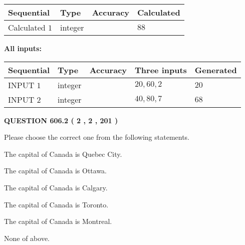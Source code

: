 \documentclass[12pt]{article}
\begin{document}
   
\noindent{}
   
   
  
  
\noindent\begin{tabular}{|l|l|l|l|}
\hline
 Sequential & Type & Accuracy & Calculated \\ 
\hline
 
 
  Calculated $  1 $ & integer &  & 
  $ 88 $ 
 \\  \hline  
 \end{tabular}
   
   
   
   
\noindent\vspace{0.1in}\hspace{-0.08in} {\textbf{\Large{All inputs: }}}
   
   
  
  
\noindent\begin{tabular}{|l|l|l|l|l|}
\hline
 Sequential & Type & Accuracy & Three inputs & Generated \\ 
\hline
 
 
  INPUT $  1 $ & integer &  & $
 20
 , 
 60
 , 
 2
 $ & $ 20 $ 
 \\  \hline  
 
 
  INPUT $  2 $ & integer &  & $
 40
 , 
 80
 , 
 7
 $ & $ 68 $ 
 \\  \hline  
 \end{tabular}
   
   
  
\vspace{0.2in}
  
{\textbf{\Large{QUESTION
606.2 
 ( 2 , 2 , 201 )
}}}
  
  
Please choose the correct one from the following statements.
 
 
The capital of Canada is Quebec City.
 
 
The capital of Canada is Ottawa.
 
 
The capital of Canada is Calgary.
 
 
The capital of Canada is Toronto.
 
 
The capital of Canada is Montreal.
 
 
 None of above.
 
 
\noindent{}
 
\end{document}
